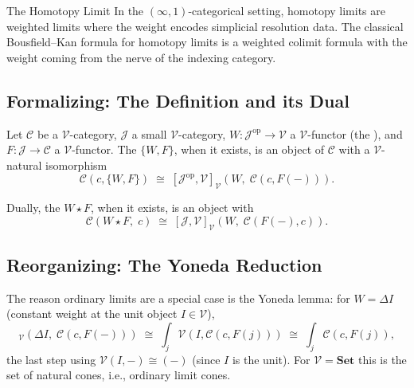 \begin{example}{The Homotopy Limit}
In the $(\infty,1)$-categorical setting, homotopy limits are weighted limits
where the weight encodes simplicial resolution data. The classical Bousfield--Kan
formula for homotopy limits is a weighted colimit formula with the weight
coming from the nerve of the indexing category.
\end{example}

\subsection{Formalizing: The Definition and its Dual}

\begin{definition}
Let $\mathcal{C}$ be a $\mathcal{V}$-category, $\mathcal{J}$ a small
$\mathcal{V}$-category, $W : \mathcal{J}^{\mathrm{op}} \to \mathcal{V}$ a
$\mathcal{V}$-functor (the ), and $F : \mathcal{J} \to \mathcal{C}$
a $\mathcal{V}$-functor. The  $\{W, F\}$, when it
exists, is an object of $\mathcal{C}$ with a $\mathcal{V}$-natural isomorphism
\begin{equation*}
  \mathcal{C}(c, \{W, F\})
  \;\cong\;
  [\mathcal{J}^{\mathrm{op}}, \mathcal{V}]_\mathcal{V}(W,\; \mathcal{C}(c, F(-))).
\end{equation*}

Dually, the  $W \star F$, when it exists, is an
object with
\begin{equation*}
  \mathcal{C}(W \star F,\; c)
  \;\cong\;
  [\mathcal{J}, \mathcal{V}]_\mathcal{V}(W,\; \mathcal{C}(F(-), c)).
\end{equation*}
\end{definition}

\subsection{Reorganizing: The Yoneda Reduction}

The reason ordinary limits are a special case is the Yoneda lemma: for $W =
\Delta I$ (constant weight at the unit object $I \in \mathcal{V}$),
\begin{equation*}
  [\mathcal{J}^{\mathrm{op}}, \mathcal{V}]_\mathcal{V}(\Delta I,\; \mathcal{C}(c, F(-)))
  \;\cong\;
  \int_j \mathcal{V}(I, \mathcal{C}(c, F(j)))
  \;\cong\;
  \int_j \mathcal{C}(c, F(j)),
\end{equation*}
the last step using $\mathcal{V}(I, -) \cong (-)$ (since $I$ is the unit).
For $\mathcal{V} = \mathbf{Set}$ this is the set of natural cones, i.e., ordinary
limit cones.

